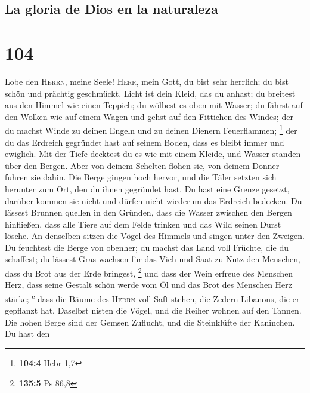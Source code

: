 \hypertarget{la-gloria-de-dios-en-la-naturaleza}{%
\subsection{La gloria de Dios en la
naturaleza}\label{la-gloria-de-dios-en-la-naturaleza}}

\hypertarget{section-103}{%
\section{104}\label{section-103}}

 Lobe den \textsc{Herrn}, meine Seele! \textsc{Herr}, mein
Gott, du bist sehr herrlich; du bist schön und prächtig geschmückt.
 Licht ist dein Kleid, das du anhast; du breitest aus den
Himmel wie einen Teppich;  du wölbest es oben mit Wasser;
du fährst auf den Wolken wie auf einem Wagen und gehst auf den Fittichen
des Windes;  der du machst Winde zu deinen Engeln und zu
deinen Dienern Feuerflammen; \footnote{\textbf{104:4} Hebr 1,7}
 der du das Erdreich gegründet hast auf seinem Boden, dass
es bleibt immer und ewiglich.  Mit der Tiefe decktest du
es wie mit einem Kleide, und Wasser standen über den Bergen.
 Aber von deinem Schelten flohen sie, von deinem Donner
fuhren sie dahin.  Die Berge gingen hoch hervor, und die
Täler setzten sich herunter zum Ort, den du ihnen gegründet hast.
 Du hast eine Grenze gesetzt, darüber kommen sie nicht und
dürfen nicht wiederum das Erdreich bedecken.  Du lässest
Brunnen quellen in den Gründen, dass die Wasser zwischen den Bergen
hinfließen,  dass alle Tiere auf dem Felde trinken und
das Wild seinen Durst lösche.  An denselben sitzen die
Vögel des Himmels und singen unter den Zweigen.  Du
feuchtest die Berge von obenher; du machst das Land voll Früchte, die du
schaffest;  du lässest Gras wachsen für das Vieh und Saat
zu Nutz den Menschen, dass du Brot aus der Erde bringest, \footnote{\textbf{135:5}
  Ps 86,8}  und dass der Wein erfreue des Menschen Herz,
dass seine Gestalt schön werde vom Öl und das Brot des Menschen Herz
stärke; \textsuperscript{c}  dass die Bäume des
\textsc{Herrn} voll Saft stehen, die Zedern Libanons, die er gepflanzt
hat.  Daselbst nisten die Vögel, und die Reiher wohnen
auf den Tannen.  Die hohen Berge sind der Gemsen
Zuflucht, und die Steinklüfte der Kaninchen.  Du hast den
